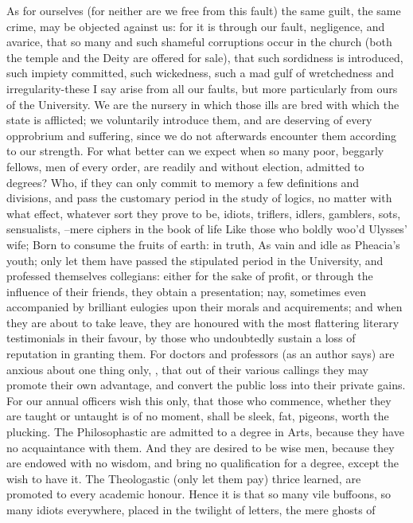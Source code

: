 As for ourselves (for neither are we free from this fault) the same guilt, the
same crime, may be objected against us: for it is through our fault,
negligence, and avarice, that so many and such shameful corruptions occur in
the church (both the temple and the Deity are offered for sale), that such
sordidness is introduced, such impiety committed, such wickedness, such a mad
gulf of wretchedness and irregularity-these I say arise from all our faults,
but more particularly from ours of the University. We are the nursery in which
those ills are bred with which the state is afflicted; we voluntarily introduce
them, and are deserving of every opprobrium and suffering, since we do not
afterwards encounter them according to our strength. For what better can we
expect when so many poor, beggarly fellows, men of every order, are readily and
without election, admitted to degrees? Who, if they can only commit to memory a
few definitions and divisions, and pass the customary period in the study of
logics, no matter with what effect, whatever sort they prove to be, idiots,
triflers, idlers, gamblers, sots, sensualists, --mere ciphers in the book of
life Like those who boldly woo'd Ulysses' wife; Born to consume the fruits of
earth: in truth, As vain and idle as Pheacia's youth; only let them have passed
the stipulated period in the University, and professed themselves collegians:
either for the sake of profit, or through the influence of their friends, they
obtain a presentation; nay, sometimes even accompanied by brilliant eulogies
upon their morals and acquirements; and when they are about to take leave, they
are honoured with the most flattering literary testimonials in their favour, by
those who undoubtedly sustain a loss of reputation in granting them. For
doctors and professors (as an author says) are anxious about one thing only,
, that out of their various callings they may promote their own advantage,
and convert the public loss into their private gains. For our annual officers
wish this only, that those who commence, whether they are taught or untaught is
of no moment, shall be sleek, fat, pigeons, worth the plucking. The
Philosophastic are admitted to a degree in Arts, because they have no
acquaintance with them. And they are desired to be wise men, because they are
endowed with no wisdom, and bring no qualification for a degree, except the
wish to have it. The Theologastic (only let them pay) thrice learned, are
promoted to every academic honour. Hence it is that so many vile buffoons, so
many idiots everywhere, placed in the twilight of letters, the mere ghosts of
